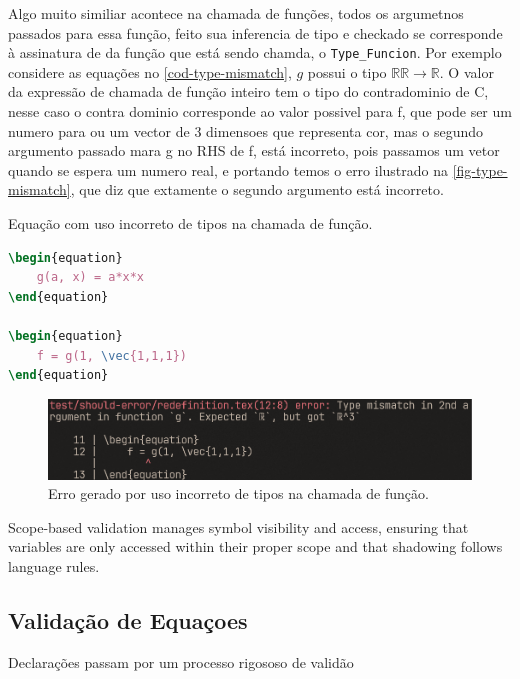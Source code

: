 Algo muito similiar acontece na chamada de funções, todos os argumetnos passados para essa função, feito sua inferencia de tipo e checkado se corresponde à assinatura de da função que está sendo chamda, o \verb`Type_Funcion`.
Por exemplo considere as equações no \autoref{cod-type-mismatch}, $g$ possui o tipo $\mathbb{R}\mathbb{R} \to \mathbb{R}$. O valor da expressão de chamada de função inteiro tem o tipo do contradominio de C, nesse caso o contra dominio corresponde ao valor possivel para f, que pode ser um numero para ou um vector de 3 dimensoes que representa cor, mas o segundo argumento passado mara g no RHS de f, está incorreto, pois passamos um vetor quando se espera um numero real, e portando temos o erro ilustrado na \autoref{fig-type-mismatch}, que diz que extamente o segundo argumento está incorreto.
\begin{codigo}[htb]
    \caption{\small Equação com uso incorreto de tipos na chamada de função. }
    \label{cod-type-mismatch}
\begin{lstlisting}[language=tex, numbers=none, frame=none, inputencoding=latin1]
\begin{equation}
    g(a, x) = a*x*x
\end{equation}

\begin{equation}
    f = g(1, \vec{1,1,1})
\end{equation}

\end{lstlisting}
\end{codigo}

\begin{figure}[H]
    \caption{\label{fig-type-mismatch} \small Erro gerado por uso incorreto de tipos na chamada de função.}
    \begin{center}
        \includegraphics[scale=0.5]{./Imagens/error-type-mismatch.png}
    \end{center}
\end{figure}

Scope-based validation manages symbol visibility and access, ensuring that variables are only accessed within their proper scope and that shadowing follows language rules.

\subsection{Validação de Equaçoes}
Declarações passam por um processo rigososo de validão

